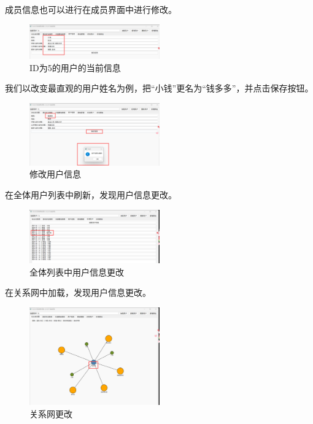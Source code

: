 \documentclass[12pt,a4paper]{article}
\begin{document}
成员信息也可以进行在成员界面中进行修改。

\begin{figure}[H]
    \centering
    \includegraphics[width=0.5\textwidth]{pt2-40.png}
    \caption{ID为5的用户的当前信息}
\end{figure}

我们以改变最直观的用户姓名为例，把“小钱”更名为“钱多多”，并点击保存按钮。

\begin{figure}[H]
    \centering
    \includegraphics[width=0.5\textwidth]{pt2-41.png}
    \caption{修改用户信息}
\end{figure}

在全体用户列表中刷新，发现用户信息更改。

\begin{figure}[H]
    \centering
    \includegraphics[width=0.5\textwidth]{pt2-42.png}
    \caption{全体列表中用户信息更改}
\end{figure}

在关系网中加载，发现用户信息更改。

\begin{figure}[H]
    \centering
    \includegraphics[width=0.5\textwidth]{pt2-43.png}
    \caption{关系网更改}
\end{figure}
\end{document}

